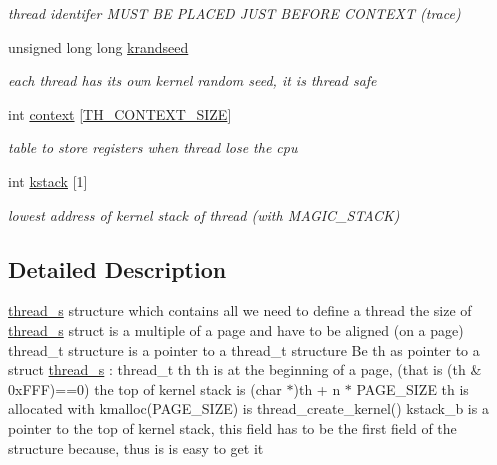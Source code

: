 \begin{DoxyCompactItemize}
\begin{DoxyCompactList}\small\item\em thread identifer M\-U\-S\-T B\-E P\-L\-A\-C\-E\-D J\-U\-S\-T B\-E\-F\-O\-R\-E C\-O\-N\-T\-E\-X\-T (trace) \end{DoxyCompactList}\item 
unsigned long long \hyperlink{structthread__s_ae4614b780e1a47305c562869870d6e41}{krandseed}
\begin{DoxyCompactList}\small\item\em each thread has its own kernel random seed, it is thread safe \end{DoxyCompactList}\item 
int \hyperlink{structthread__s_a668771e7e3444ba13544b50e1ff312a6}{context} \mbox{[}\hyperlink{riscv_2context_8h_a6184dc1954e7a66049cb4b3b314c87f9}{T\-H\-\_\-\-C\-O\-N\-T\-E\-X\-T\-\_\-\-S\-I\-Z\-E}\mbox{]}
\begin{DoxyCompactList}\small\item\em table to store registers when thread lose the cpu \end{DoxyCompactList}\item 
int \hyperlink{structthread__s_a1159b3f03199aed705bf099f2eb33a92}{kstack} \mbox{[}1\mbox{]}
\begin{DoxyCompactList}\small\item\em lowest address of kernel stack of thread (with M\-A\-G\-I\-C\-\_\-\-S\-T\-A\-C\-K) \end{DoxyCompactList}\end{DoxyCompactItemize}


\subsection{Detailed Description}
\hyperlink{structthread__s}{thread\-\_\-s} structure which contains all we need to define a thread the size of \hyperlink{structthread__s}{thread\-\_\-s} struct is a multiple of a page and have to be aligned (on a page) thread\-\_\-t structure is a pointer to a thread\-\_\-t structure Be th as pointer to a struct \hyperlink{structthread__s}{thread\-\_\-s} \-: thread\-\_\-t th th is at the beginning of a page, (that is (th \& 0x\-F\-F\-F)==0) the top of kernel stack is (char $\ast$)th + n $\ast$ P\-A\-G\-E\-\_\-\-S\-I\-Z\-E th is allocated with kmalloc(\-P\-A\-G\-E\-\_\-\-S\-I\-Z\-E) is thread\-\_\-create\-\_\-kernel() kstack\-\_\-b is a pointer to the top of kernel stack, this field has to be the first field of the structure because, thus is is easy to get it 

